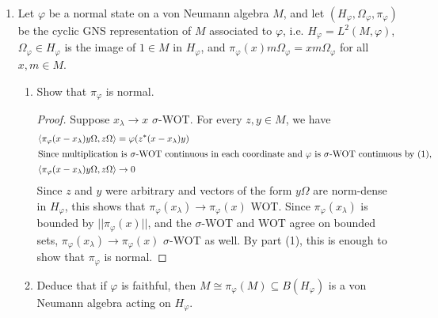 \documentclass[a4paper,10pt]{report}
\newcommand{\ggen}[1]{\langle#1\rangle}
\newcommand{\norm}[1]{||#1||}
\begin{document}
\begin{enumerate}
\begin{enumerate}
\begin{proof}
				For the sake of completeness, we should say why the $\sigma$-WOT topology on $M(1-z)$ is the subspace topology coming from $M$. When constructing the predual, we found that for a von-Neumann algebra $A$, we have $A_*\cong L^1(B(H))/A_\perp$, where $A_\perp$ is precisely those elements $y\in L^1(B(H))$ so that $\tr(ay)=0$ for every $a\in A$. Therefore, the $\sigma$-WOT topology on any $A\subseteq B(H)$ is actually induced by the (usually redundant) family of seminorms ${(a\to |\tr(ay)|)_{y\in L^1(B(H))}}$, and every von-Neumann algebra $A\subseteq B(H)$ has the induced $\sigma$-WOT topology from $B(H)$. %
				\end{proof}
			\item Let $\varphi$ be a normal state on a von Neumann algebra $M$,
			and let $(H_\varphi, \Omega_\varphi, \pi_\varphi)$ be the cyclic GNS representation
			of $M$ associated to $\varphi$, i.e. $H_\varphi = L^2(M, \varphi)$,
			$\Omega_\varphi \in H_\varphi$ is the image of $1 \in M$ in $H_\varphi$,
			and $\pi_\varphi(x)m\Omega_\varphi = xm\Omega_\varphi$ for all $x, m \in M$.
				\begin{enumerate}
					\item Show that $\pi_\varphi$ is normal.
					\begin{proof}
					Suppose $x_\lambda\to x$ $\sigma$-WOT. For every $z,y\in M$, we have 
						\begin{align*}
							\ggen{\pi_\varphi(x-x_\lambda)y\Omega,z\Omega} &= \varphi(z^*(x-x_\lambda)y)\\
							\intertext{Since multiplication is $\sigma$-WOT continuous in each coordinate and $\varphi$ is $\sigma$-WOT continuous by (1), }
							\ggen{\pi_\varphi(x-x_\lambda)y\Omega,z\Omega}&\to 0
						\end{align*}
							Since $z$ and $y$ were arbitrary and vectors of the form $y\Omega$ are norm-dense in $H_\varphi$, this shows that $\pi_\varphi(x_\lambda)\to\pi_\varphi(x)$ WOT. 
							Since $\pi_\varphi(x_\lambda)$ is bounded by $\norm{\pi_\varphi(x)}$, and the $\sigma$-WOT and WOT agree on bounded sets, $\pi_\varphi(x_\lambda)\to\pi_\varphi(x)$ $\sigma$-WOT as well. %
							By part (1), this is enough to show that $\pi_\varphi$ is normal. 
							\end{proof}
						\item Deduce that if $\varphi$ is faithful,
						then $M \cong \pi_\varphi(M) \subseteq B(H_\varphi)$
						is a von Neumann algebra acting on $H_\varphi$.

\end{enumerate}
\end{enumerate}
\end{enumerate}
\end{document}
